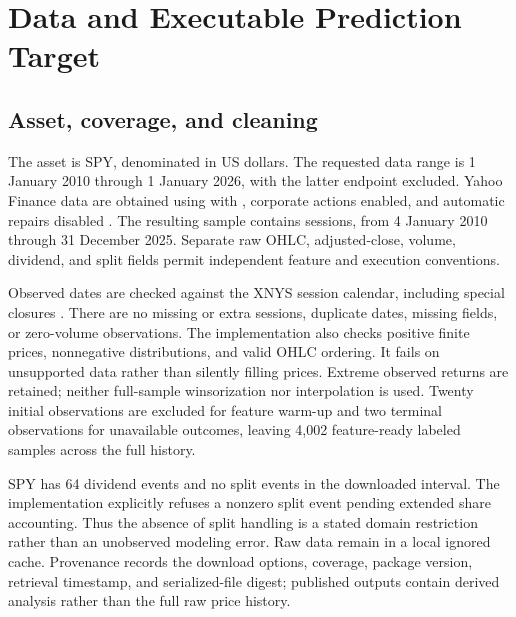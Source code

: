 \section{Data and Executable Prediction Target}
\label{sec:data}
\subsection{Asset, coverage, and cleaning}
The asset is SPY, denominated in US dollars. The requested data range is 1 January 2010 through 1 January 2026, with the latter endpoint excluded. Yahoo Finance data are obtained using  with , corporate actions enabled, and automatic repairs disabled \citep{yfinance}. The resulting sample contains \SessionCount{} sessions, from 4 January 2010 through 31 December 2025. Separate raw OHLC, adjusted-close, volume, dividend, and split fields permit independent feature and execution conventions.

Observed dates are checked against the XNYS session calendar, including special closures \citep{exchangecalendars}. There are no missing or extra sessions, duplicate dates, missing fields, or zero-volume observations. The implementation also checks positive finite prices, nonnegative distributions, and valid OHLC ordering. It fails on unsupported data rather than silently filling prices. Extreme observed returns are retained; neither full-sample winsorization nor interpolation is used. Twenty initial observations are excluded for feature warm-up and two terminal observations for unavailable outcomes, leaving 4,002 feature-ready labeled samples across the full history.

SPY has 64 dividend events and no split events in the downloaded interval. The implementation explicitly refuses a nonzero split event pending extended share accounting. Thus the absence of split handling is a stated domain restriction rather than an unobserved modeling error. Raw data remain in a local ignored cache. Provenance records the download options, coverage, package version, retrieval timestamp, and serialized-file digest; published outputs contain derived analysis rather than the full raw price history.

